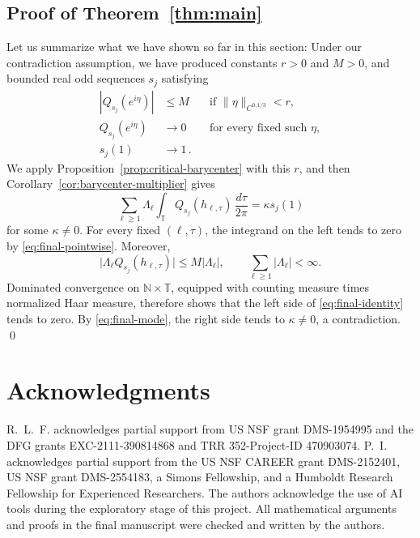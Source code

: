 \documentclass[11pt]{amsart}
\theoremstyle{definition}
\theoremstyle{remark}
\newcommand{\T}{\mathbb T}
\newcommand{\N}{\mathbb N}
\begin{document}

\subsection{Proof of Theorem~\ref{thm:main}}

Let us summarize what we have shown so far in this section: Under our contradiction assumption, we have produced constants $r>0$ and $M>0$, and bounded real odd sequences $s_j$ satisfying
\begin{align}
 |Q_{s_j}(e^{i\eta})|&\leq M
 &&\text{if }\|\eta\|_{C^{0,1/3}}<r,\label{eq:final-uniform}\\
 Q_{s_j}(e^{i\eta})&\longrightarrow0
 &&\text{for every fixed such }\eta,\label{eq:final-pointwise}\\
 s_j(1)&\longrightarrow1 \,.\label{eq:final-mode}
\end{align}
We apply Proposition~\ref{prop:critical-barycenter} with this $r$, and then  Corollary~\ref{cor:barycenter-multiplier} gives
\begin{equation}\label{eq:final-identity}
 \sum_{\ell\geq1}\Lambda_\ell
 \int_\T Q_{s_j}(h_{\ell,\tau})\,\frac{d\tau}{2\pi}
 =\kappa s_j(1)
\end{equation}
for some $\kappa\neq 0$. For every fixed $(\ell,\tau)$, the integrand on the left tends to zero by \eqref{eq:final-pointwise}. Moreover,
\[
 \big|\Lambda_\ell Q_{s_j}(h_{\ell,\tau})\big|
 \leq M|\Lambda_\ell|,
 \qquad
 \sum_{\ell\geq1}|\Lambda_\ell|<\infty.
\]
Dominated convergence on $\N\times\T$, equipped with counting measure times normalized Haar measure, therefore shows that the left side of \eqref{eq:final-identity} tends to zero. By \eqref{eq:final-mode}, the right side tends to $\kappa\ne0$, a contradiction.
\qed


\section*{Acknowledgments}
R.~L.~F. acknowledges partial support from US NSF grant DMS-1954995 and the DFG grants EXC-2111-390814868 and TRR 352-Project-ID 470903074.  P.~I. acknowledges partial support from the US NSF CAREER grant DMS-2152401, US NSF grant DMS-2554183, a Simons Fellowship, and a Humboldt Research Fellowship for Experienced Researchers.  The authors acknowledge the use of AI tools during the exploratory stage of this project.  All mathematical arguments and proofs in the final manuscript were checked and written by the authors.
\end{document}

